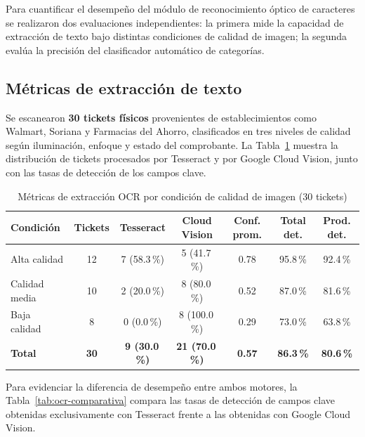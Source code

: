 Para cuantificar el desempeño del módulo de reconocimiento óptico de caracteres se realizaron dos evaluaciones independientes: la primera mide la capacidad de extracción de texto bajo distintas condiciones de calidad de imagen; la segunda evalúa la precisión del clasificador automático de categorías.

\subsection{Métricas de extracción de texto}

Se escanearon \textbf{30 tickets físicos} provenientes de establecimientos como Walmart, Soriana y Farmacias del Ahorro, clasificados en tres niveles de calidad según iluminación, enfoque y estado del comprobante. La Tabla~\ref{tab:ocr-extraccion} muestra la distribución de tickets procesados por Tesseract y por Google Cloud Vision, junto con las tasas de detección de los campos clave.

\begin{table}[H]
  \centering
  \small
  \caption{Métricas de extracción OCR por condición de calidad de imagen (30 tickets)}
  \label{tab:ocr-extraccion}
  \begin{tabular}{l c c c c c c}
    \toprule
    \textbf{Condición} & \textbf{Tickets} &
    \textbf{Tesseract} & \textbf{Cloud Vision} &
    \textbf{Conf. prom.} &
    \textbf{Total det.} & \textbf{Prod. det.} \\
    \midrule
    Alta calidad  & 12 &  7 (58.3\,\%) &  5 (41.7\,\%)  & 0.78 & 95.8\,\% & 92.4\,\% \\
    Calidad media & 10 &  2 (20.0\,\%) &  8 (80.0\,\%)  & 0.52 & 87.0\,\% & 81.6\,\% \\
    Baja calidad  &  8 &  0  (0.0\,\%) &  8 (100.0\,\%) & 0.29 & 73.0\,\% & 63.8\,\% \\
    \midrule
    \textbf{Total} & \textbf{30} & \textbf{9 (30.0\,\%)} & \textbf{21 (70.0\,\%)} & \textbf{0.57} & \textbf{86.3\,\%} & \textbf{80.6\,\%} \\
    \bottomrule
  \end{tabular}
\end{table}

Para evidenciar la diferencia de desempeño entre ambos motores, la Tabla~\ref{tab:ocr-comparativa} compara las tasas de detección de campos clave obtenidas exclusivamente con Tesseract frente a las obtenidas con Google Cloud Vision.

